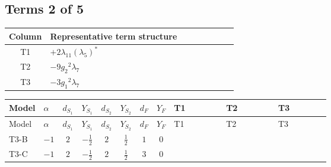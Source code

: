 \documentclass[8pt]{article}
\begin{document}
\begin{landscape}
\subsection*{Terms 2 of 5}
\begin{center}
\begin{tabular}{@{}c >{\raggedright\arraybackslash}p{0.82\linewidth}@{}}
\toprule
Column & Representative term structure \\
\midrule
T1 & \(\displaystyle +2 {\lambda_{11}} \left({\lambda_5}\right)^{*}\) \\
\midrule
T2 & \(\displaystyle -9 {g_2}^2 {\lambda_{7}}\) \\
\midrule
T3 & \(\displaystyle -3 {g_1}^2 {\lambda_{7}}\) \\
\midrule
\bottomrule
\end{tabular}
\end{center}
\smallskip
\tiny
\begin{longtable}{@{}llcccccc >{\raggedright\arraybackslash}p{0.21\linewidth} >{\raggedright\arraybackslash}p{0.21\linewidth} >{\raggedright\arraybackslash}p{0.21\linewidth}@{}}
\toprule
Model & $\alpha$ & $d_{S_1}$ & $Y_{S_1}$ & $d_{S_2}$ & $Y_{S_2}$ & $d_F$ & $Y_F$ & T1 & T2 & T3 \\
\midrule
\endfirsthead
\toprule
Model & $\alpha$ & $d_{S_1}$ & $Y_{S_1}$ & $d_{S_2}$ & $Y_{S_2}$ & $d_F$ & $Y_F$ & T1 & T2 & T3 \\
\midrule
\endhead
T3-B & $-1$ & $2$ & $-\frac{1}{2}$ & $2$ & $\frac{1}{2}$ & $1$ & $0$ & \scriptsize\adjustbox{max width=\linewidth}{$\begin{gathered} +2 {\lambda_{11}} \left({\lambda_5}\right)^{*}\end{gathered}$} & \scriptsize\adjustbox{max width=\linewidth}{$\begin{gathered} -9 {g_2}^2 {\lambda_{7}}\end{gathered}$} & \scriptsize\adjustbox{max width=\linewidth}{$\begin{gathered} -3 {g_1}^2 {\lambda_{7}}\end{gathered}$} \\
\midrule
T3-C & $-1$ & $2$ & $-\frac{1}{2}$ & $2$ & $\frac{1}{2}$ & $3$ & $0$ & \scriptsize\adjustbox{max width=\linewidth}{$\begin{gathered} +2 {\lambda_{11}} \left({\lambda_5}\right)^{*}\end{gathered}$} & \scriptsize\adjustbox{max width=\linewidth}{$\begin{gathered} -9 {g_2}^2 {\lambda_{7}}\end{gathered}$} & \scriptsize\adjustbox{max width=\linewidth}{$\begin{gathered} -3 {g_1}^2 {\lambda_{7}}\end{gathered}$} \\

\end{longtable}
\end{landscape}
\end{document}
